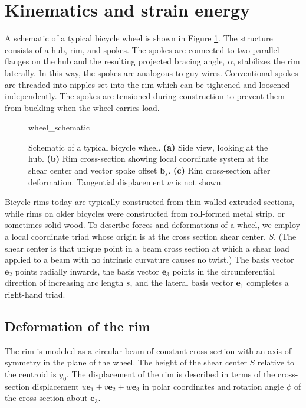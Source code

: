 \documentclass[\rootdir/thesis.tex]{subfiles}
\begin{document}
\section{Kinematics and strain energy}
A schematic of a typical bicycle wheel is shown in Figure \ref{fig:wheel_schematic}. The structure consists of a hub, rim, and spokes. The spokes are connected to two parallel flanges on the hub and the resulting projected bracing angle, $\alpha$,  stabilizes the rim laterally. In this way, the spokes are analogous to guy-wires. Conventional spokes are threaded into nipples set into the rim which can be tightened and loosened independently. The spokes are tensioned during construction to prevent them from buckling when the wheel carries load.

\begin{figure}[h]
\centering
{wheel_schematic}
\caption{Schematic of a typical bicycle wheel. \textbf{(a)} Side view, looking at the hub. \textbf{(b)} Rim cross-section showing local coordinate system at the shear center and vector spoke offset $\mathbf{b}_s$. \textbf{(c)} Rim cross-section after deformation. Tangential displacement $w$ is not shown.}
\label{fig:wheel_schematic}
\end{figure}

Bicycle rims today are typically constructed from thin-walled extruded sections, while rims on older bicycles were constructed from roll-formed metal strip, or sometimes solid wood. To describe forces and deformations of a wheel, we employ a local coordinate triad whose origin is at the cross section shear center, $S$. (The shear center is that unique point in a beam cross section at which a shear load applied to a beam with no intrinsic curvature causes no twist.) The basis vector $\mathbf{e}_2$ points radially inwards, the basis vector $\mathbf{e}_3$ points in the circumferential direction of increasing arc length $s$, and the lateral basis vector $\mathbf{e}_1$ completes a right-hand triad.

\subsection{Deformation of the rim}

The rim is modeled as a circular beam of constant cross-section with an axis of symmetry in the plane of the wheel. The height of the shear center $S$ relative to the centroid is $y_0$. The displacement of the rim is described in terms of the cross-section displacement $u\mathbf{e}_1 + v\mathbf{e}_2 + w\mathbf{e}_3$ in polar coordinates and rotation angle $\phi$ of the cross-section about $\mathbf{e}_3$.
\end{document}

